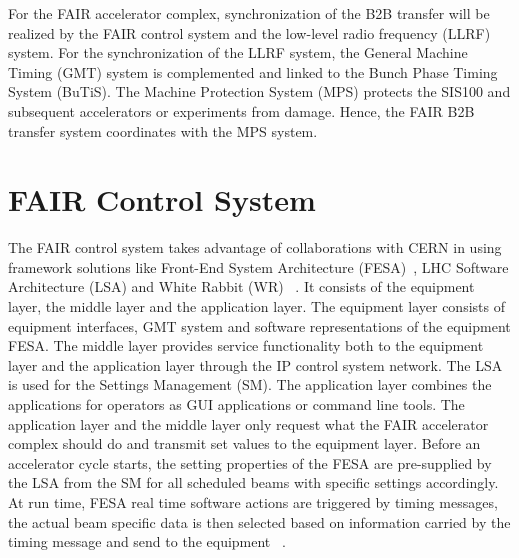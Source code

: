 
For the FAIR accelerator complex, synchronization of the B2B transfer will be realized by the FAIR control system and the low-level radio frequency (LLRF) system. For the synchronization of the LLRF system, the General Machine Timing (\gls{GMT}) system is complemented and linked to the Bunch Phase Timing System (BuTiS). The Machine Protection System (MPS) protects the SIS100 and subsequent accelerators or experiments from damage. Hence, the FAIR B2B transfer system coordinates with the MPS system. 
\section{FAIR Control System}
The \gls{FAIR} control system takes advantage of collaborations with CERN in using framework solutions like Front-End System Architecture (\gls{FESA})~\cite{hoffmann_fesafront-end_2008}, LHC Software Architecture (\gls{LSA}) and White Rabbit (\gls{WR}) ~\cite{huhmann_fair_2013}. It consists of the equipment layer, the middle layer and the application layer. The equipment layer consists of equipment interfaces, GMT system and software representations of the equipment FESA. The middle layer provides service functionality both to the equipment layer and the application layer through the IP control system network. The LSA is used for the Settings Management (SM). The application layer combines the applications for operators as \gls{GUI} applications or command line tools. The application layer and the middle layer only request what the FAIR accelerator complex should do and transmit set values to the equipment layer. Before an accelerator cycle starts, the setting properties of the FESA are pre-supplied by the LSA from the \gls{SM} for all scheduled beams with specific settings accordingly. At run time, FESA real time software actions are triggered by timing messages, the actual beam specific data is then selected based on information carried by the timing message and send to the equipment ~\cite{huhmann_fair_2013}. 

